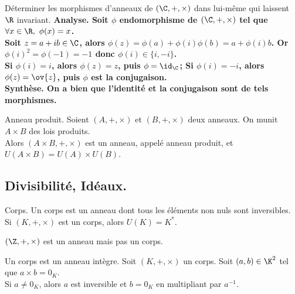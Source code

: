 \documentclass[11pt]{article}
\begin{document}
\vspace*{-0.8cm}

\begin{ex}{}{}
    Déterminer les morphismes d'anneaux de $(\C,+,\times)$ dans lui-même qui laissent $\R$ invariant.
    \tcblower
    \bf{Analyse.} Soit $\phi$ endomorphisme de $(\C,+,\times)$ tel que $\forall x \in \R, ~ \phi(x)=x$.\\
    Soit $z=a+ib\in\C$, alors $\phi(z)=\phi(a)+\phi(i)\phi(b)=a+\phi(i)b$. Or $\phi(i)^2=\phi(-1)=-1$ donc $\phi(i)\in\{i,-i\}$.\\
    Si $\phi(i)=i$, alors $\phi(z)=z$, puis $\phi=\id_\C$; Si $\phi(i)=-i$, alors $\phi(z)=\ov{z}$, puis $\phi$ est la conjugaison.\\
    \bf{Synthèse.} On a bien que l'identité et la conjugaison sont de tels morphismes.
\end{ex}

\vspace*{-0.8cm}

\begin{defi}{Anneau produit.}{}
    Soient $(A,+,\times)$ et $(B,+,\times)$ deux anneaux. On munit $A\times B$ des lois produits.\\
    Alors $(A\times B, +, \times)$ est un anneau, appelé anneau produit, et $U(A\times B)=U(A)\times U(B)$.
\end{defi}

\vspace*{-0.8cm}

\subsection{Divisibilité, Idéaux.}

\begin{defi}{Corps.}{}
    Un corps est un anneau dont tous les éléments non nuls sont inversibles.\\
    Si $(K,+,\times)$ est un corps, alors $U(K)=K^*$.
\end{defi}

\vspace*{-0.8cm}

\begin{ex}{}{}
    $(\Z,+,\times)$ est un anneau mais pas un corps.
\end{ex}

\vspace*{-0.8cm}

\begin{prop}{}{}
    Un corps est un anneau intègre.
    \tcblower
    Soit $(K,+,\times)$ un corps. Soit $(a,b)\in\K^2$ tel que $a\times b=0_K$.\\
    Si $a\neq0_K$, alors $a$ est inversible et $b=0_K$ en multipliant par $a^{-1}$.
\end{prop}
\end{document}
